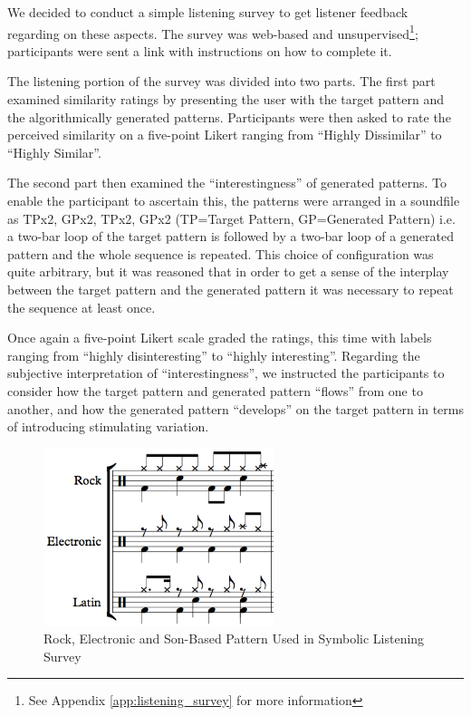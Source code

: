 We decided to conduct a simple listening survey to get listener feedback regarding on these aspects. The survey was web-based and unsupervised\footnote{See Appendix \ref{app:listening_survey} for more information}; participants were sent a link with instructions on how to complete it. 

The listening portion of the survey was divided into two parts. The first part examined similarity ratings by presenting the user with the target pattern and the algorithmically generated patterns. Participants were then asked to rate the perceived similarity on a five-point Likert ranging from “Highly Dissimilar” to “Highly Similar”.

The second part then examined the “interestingness” of generated patterns. To enable the participant to ascertain this, the  patterns were arranged in a soundfile as TPx2, GPx2, TPx2, GPx2 (TP=Target Pattern, GP=Generated Pattern) i.e. a two-bar loop of the target pattern is followed by a two-bar loop of a generated pattern and the whole sequence is repeated. This choice of configuration was quite arbitrary, but it was reasoned that in order to get a sense of the interplay between the target pattern and the generated pattern it was necessary to repeat the sequence at least once.

Once again a five-point Likert scale graded the ratings, this time with labels ranging from ``highly disinteresting'' to ``highly interesting''. Regarding the subjective interpretation of ``interestingness'', we instructed the participants to consider how the target pattern and generated pattern ``flows'' from one to another, and how the generated pattern ``develops'' on the target pattern in terms of introducing stimulating variation.

\begin{figure}
	\begin{center}
		\includegraphics[width=0.6\textwidth]{ch03_symbolic/figures/patterns.png}
	\end{center}
	\caption[Rock, Electronic and Son-Based Pattern Used in Symbolic Listening Survey]{Rock, Electronic and Son-Based Pattern Used in Symbolic Listening Survey}
	\label{fig:symbolic_patterns}
\end{figure}

